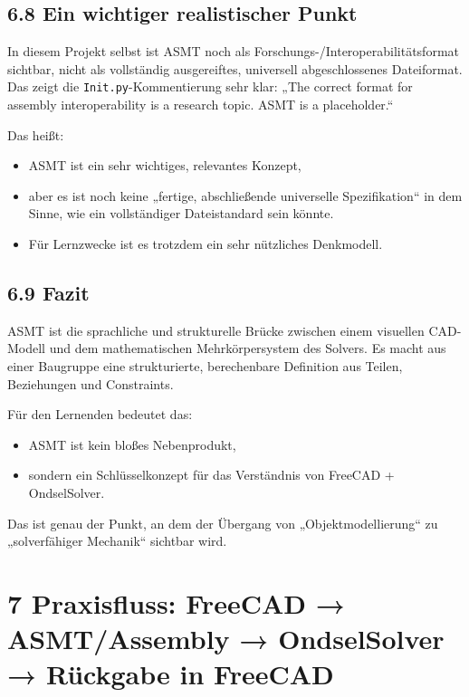 \documentclass[
  12pt
]{book}
\providecommand{\tightlist}{%
  \setlength{\itemsep}{0pt}\setlength{\parskip}{0pt}}
\begin{document}
\hypertarget{ein-wichtiger-realistischer-punkt}{%
\section{\texorpdfstring{{6.8} Ein wichtiger realistischer
Punkt}{6.8 Ein wichtiger realistischer Punkt}}\label{ein-wichtiger-realistischer-punkt}}

In diesem Projekt selbst ist ASMT noch als
Forschungs-/Interoperabilitätsformat sichtbar, nicht als vollständig
ausgereiftes, universell abgeschlossenes Dateiformat. Das zeigt die
\texttt{Init.py}-Kommentierung sehr klar: „The correct format for
assembly interoperability is a research topic. ASMT is a placeholder.``

Das heißt:

\begin{itemize}
\tightlist
\item
  ASMT ist ein sehr wichtiges, relevantes Konzept,
\item
  aber es ist noch keine „fertige, abschließende universelle
  Spezifikation`` in dem Sinne, wie ein vollständiger Dateistandard sein
  könnte.
\item
  Für Lernzwecke ist es trotzdem ein sehr nützliches Denkmodell.
\end{itemize}

\hypertarget{fazit-4}{%
\section{\texorpdfstring{{6.9} Fazit}{6.9 Fazit}}\label{fazit-4}}

ASMT ist die sprachliche und strukturelle Brücke zwischen einem
visuellen CAD-Modell und dem mathematischen Mehrkörpersystem des
Solvers. Es macht aus einer Baugruppe eine strukturierte, berechenbare
Definition aus Teilen, Beziehungen und Constraints.

Für den Lernenden bedeutet das:

\begin{itemize}
\tightlist
\item
  ASMT ist kein bloßes Nebenprodukt,
\item
  sondern ein Schlüsselkonzept für das Verständnis von FreeCAD +
  OndselSolver.
\end{itemize}

Das ist genau der Punkt, an dem der Übergang von „Objektmodellierung``
zu „solverfähiger Mechanik`` sichtbar wird.

\hypertarget{kap-asmt-flow}{%
\chapter{\texorpdfstring{{7} Praxisfluss: FreeCAD → ASMT/Assembly →
OndselSolver → Rückgabe in
FreeCAD}{7 Praxisfluss: FreeCAD → ASMT/Assembly → OndselSolver → Rückgabe in FreeCAD}}\label{kap-asmt-flow}}
\end{document}
